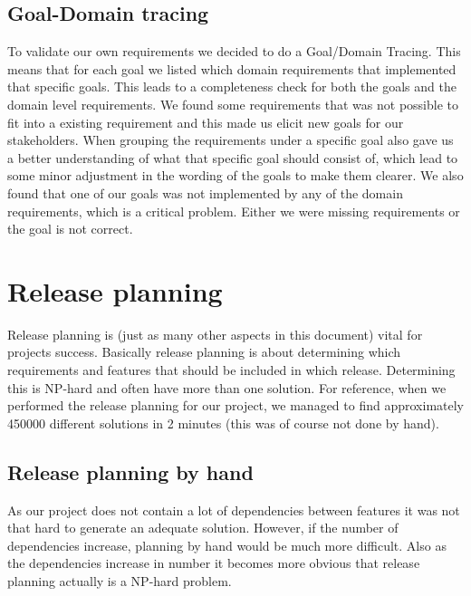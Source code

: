 \documentclass[a4paper]{article}
\begin{document}
			\subsection{Goal-Domain tracing}
				To validate our own requirements we decided to do a Goal/Domain Tracing. This means that for each goal we listed which domain requirements that implemented that specific goals. This leads to a completeness check for both the goals and the domain level requirements. We found some requirements that was not possible to fit into a existing requirement and this made us elicit new goals for our stakeholders. When grouping the requirements under a specific goal also gave us a better understanding of what that specific goal should consist of, which lead to some minor adjustment in the wording of the goals to make them clearer. We also found that one of our goals was not implemented by any of the domain requirements, which is a critical problem. Either we were missing requirements or the goal is not correct. 

	\section{Release planning}

		Release planning is (just as many other aspects in this document) vital for projects success. Basically release planning is about determining which requirements and features that should be included in which release. Determining this is NP-hard and often have more than one solution. For reference, when we performed the release planning for our project, we managed to find approximately 450000 different solutions in 2 minutes (this was of course not done by hand). 

		\subsection{Release planning by hand}
			As our project does not contain a lot of dependencies between features it was not that hard to generate an adequate solution. However, if the number of dependencies increase, planning by hand would be much more difficult. Also as the dependencies increase in number it becomes more obvious that release planning actually is a NP-hard problem.
\end{document}
